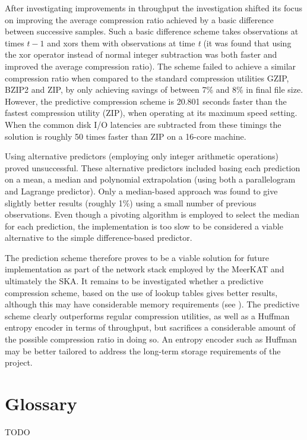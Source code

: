 After investigating improvements in throughput the investigation shifted its focus on improving the average compression ratio achieved by a basic difference between successive samples. Such a basic difference
scheme takes observations at times $t-1$ and xors them with observations at time \textit{t} (it was found that using the xor operator instead of normal integer subtraction was both faster and improved the average
compression ratio). The scheme failed to achieve a similar compression ratio when compared to the standard compression utilities GZIP, BZIP2 and ZIP, by only achieving savings of between 7\% and 8\% in final file size.
However, the predictive compression scheme is 20.801 seconds faster than the fastest compression utility (ZIP), when operating at its maximum speed setting. When the common disk I/O latencies are subtracted from these 
timings the solution is roughly 50 times faster than ZIP on a 16-core machine.

Using alternative predictors (employing only integer arithmetic operations) proved unsuccessful. These alternative predictors included basing each prediction on a mean, a median and polynomial extrapolation (using both a 
parallelogram and Lagrange predictor). Only a median-based approach was found to give slightly better results (roughly 1\%) using a small number of previous observations. Even though a pivoting algorithm is employed to 
select the median for each prediction, the implementation is too slow to be considered a viable alternative to the simple difference-based predictor.

The prediction scheme therefore proves to be a viable solution for future implementation as part of the network stack employed by the MeerKAT and ultimately the SKA. It remains to be investigated whether a predictive 
compression scheme, based on the use of lookup tables gives better results, although this may have considerable memory requirements (see \cite{1607248,4589203,4976448}). The predictive scheme clearly outperforms 
regular compression utilities, as well as a Huffman entropy encoder in terms of throughput, but sacrifices a considerable amount of the possible compression ratio in doing so. An entropy encoder such as Huffman may be 
better tailored to address the long-term storage requirements of the project.
\section{Glossary}
{\color{red}TODO}


